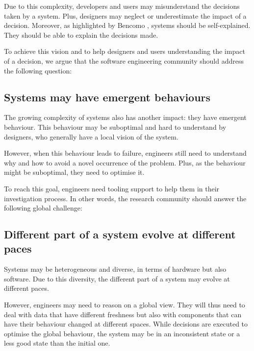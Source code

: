 Due to this complexity, developers and users may misunderstand the decisions taken by a system.
Plus, designers may neglect or underestimate the impact of a decision.
Moreover, as highlighted by Bencomo \etal \cite{DBLP:conf/iceccs/BencomoWSW12}, systems should be self-explained.
They should be able to explain the decisions made.

To achieve this vision and to help designers and users understanding the impact of a decision, we argue that the software engineering community should address the following question:
\vspace{-2em}

\subsection{Systems may have emergent behaviours}
\label{intro:challenges:ermger-bhv}
The growing complexity of systems also has another impact: they have emergent behaviour.
This behaviour may be suboptimal and hard to understand by designers, who generally have a local vision of the system.

However, when this behaviour leads to failure, engineers still need to understand why and how to avoid a novel occurrence of the problem.
Plus, as the behaviour might be suboptimal, they need to optimise it.

To reach this goal, engineers need tooling support to help them in their investigation process.
In other words, the research community should answer the following global challenge:
\vspace{-2em}

\subsection{Different part of a system evolve at different paces}
\label{intro:challenges:diff-paces}
Systems may be heterogeneous and diverse, in terms of hardware but also software.
Due to this diversity, the different part of a system may evolve at different paces.

However, engineers may need to reason on a global view.
They will thus need to deal with data that have different freshness but also with components that can have their behaviour changed at different spaces.
While decisions are executed to optimise the global behaviour, the system may be in an inconsistent state or a less good state than the initial one.


